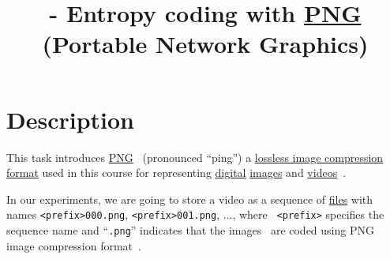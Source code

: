 


\title{\SM{} - Entropy coding with
  \href{https://vicente-gonzalez-ruiz.github.io/PNG/}{PNG} (Portable
  Network Graphics)}

\maketitle

\tableofcontents

\section{Description}

This task introduces
\href{https://en.wikipedia.org/wiki/Portable_Network_Graphics}{PNG}~\cite{vruiz__PNG}
(pronounced ``ping'') a
\href{https://en.wikipedia.org/wiki/Lossless_compression}{lossless
  image compression format} used in this course for representing
\href{https://en.wikipedia.org/wiki/Digital_data}{digital}
\href{https://en.wikipedia.org/wiki/Digital_image}{images} and
\href{https://en.wikipedia.org/wiki/Video}{videos}~\cite{vruiz__image_video}.

In our experiments, we are going to store a video as a sequence of
\href{https://en.wikipedia.org/wiki/Computer_file}{files} with names
     {\tt <prefix>000.png}, {\tt <prefix>001.png}, ..., where {\tt
       <prefix>} specifies the sequence name and ``{\tt .png}''
     indicates that the images~\cite{vruiz__image_IO} are coded using
     PNG image compression
     format~\cite{roelofs1999png,world2003portable}.


  

